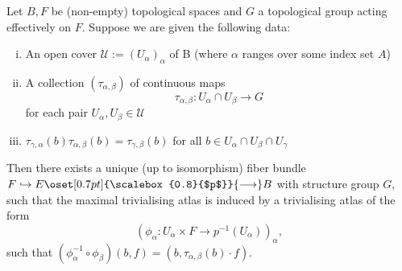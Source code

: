      \begin{theorem}
        \label{thm:fiber_bundle_construction1}
        Let $B,F$ be (non-empty) topological spaces and $G$ a topological group acting effectively on $F$. Suppose we are given the following data:
        \begin{enumerate}[(i)]
            \item An open cover $\mathcal{U} := (U_\alpha)_\alpha$ of B (where $\alpha$ ranges over some index set $A$)
            \item A collection $(\tau_{\alpha,\beta})$ of continuous maps
            \[
            \tau_{\alpha,\beta} \colon U_\alpha \cap U_\beta \to G
            \]
            for each pair $U_\alpha,U_\beta \in \mathcal{U}$
            \item $\tau_{\gamma,\alpha}(b)\tau_{\alpha,\beta}(b) = \tau_{\gamma,\beta}(b)$ for all $b \in U_\alpha \cap U_\beta \cap U_\gamma$
        \end{enumerate}
        Then there exists a unique (up to isomorphism) fiber bundle $F \hookrightarrow E \oset[0.7pt]{\scalebox{0.8}{$p$}}{\longrightarrow} B$ with structure group $G$, such that the maximal trivialising atlas is induced by a trivialising atlas of the form
        \[
        (\phi_\alpha \colon U_\alpha \times F \to p^{-1}(U_\alpha))_\alpha,
        \]
        such that $(\phi_\alpha^{-1} \circ \phi_\beta)(b,f) = (b,\tau_{\alpha,\beta}(b) \cdot f)$.
     \end{theorem}
